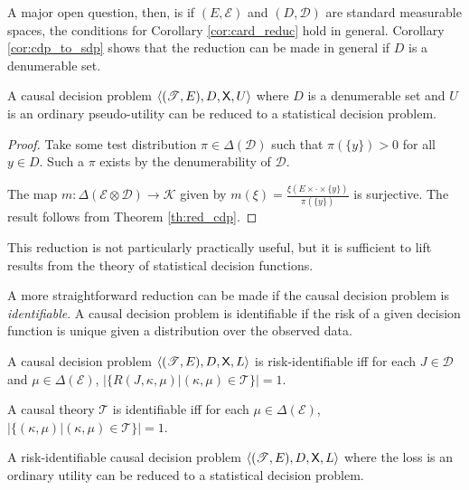 A major open question, then, is if $(E,\mathcal{E})$ and $(D,\mathcal{D})$ are standard measurable spaces, the conditions for Corollary \ref{cor:card_reduc} hold in general. Corollary \ref{cor:cdp_to_sdp} shows that the reduction can be made in general if $D$ is a denumerable set.

\begin{corollary}\label{cor:cdp_to_sdp}
A causal decision problem $\langle (\mathscr{T},E),D,\mathsf{X},U\rangle$ where $D$ is a denumerable set and  $U$ is an ordinary pseudo-utility can be reduced to a statistical decision problem.
\end{corollary}

\begin{proof}
Take some test distribution $\pi\in \Delta(\mathcal{D})$ such that $\pi(\{y\})>0$ for all $y\in D$. Such a $\pi$ exists by the denumerability of $\mathcal{D}$.

The map $m:\Delta(\mathcal{E}\otimes\mathcal{D})\to \mathscr{K}$ given by $m(\xi) = \frac{\xi(E\times \cdot\times \{y\})}{\pi(\{y\})}$ is surjective. The result follows from Theorem \ref{th:red_cdp}.
\end{proof}

This reduction is not particularly practically useful, but it is sufficient to lift results from the theory of statistical decision functions.

A more straightforward reduction can be made if the causal decision problem is \emph{identifiable}. A causal decision problem is identifiable if the risk of a given decision function is unique given a distribution over the observed data.

\begin{definition}[Identifiability]
A causal decision problem $\langle (\mathscr{T}, E), D, \mathsf{X}, L \rangle$ is risk-identifiable iff for each $J\in \mathscr{D}$ and $\mu\in \Delta(\mathcal{E})$, $|\{R(J,\kappa,\mu)|(\kappa,\mu)\in \mathscr{T}\}|=1$.

A causal theory $\mathscr{T}$ is identifiable iff for each $\mu\in \Delta(\mathcal{E})$, $|\{(\kappa,\mu)|(\kappa,\mu)\in\mathscr{T}\}|=1$.
\end{definition}

\begin{theorem}
A risk-identifiable causal decision problem $\langle (\mathscr{T}, E), D, \mathsf{X}, L \rangle$ where the loss is an ordinary utility can be reduced to a statistical decision problem.
\end{theorem}

